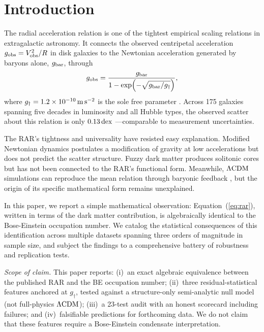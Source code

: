 \documentclass[twocolumn,twocolappendix]{aastex631}
\newcommand{\gbar}{g_{\rm bar}}
\newcommand{\gobs}{g_{\rm obs}}
\newcommand{\gdag}{g_{\dagger}}
\newcommand{\dex}{\,{\rm dex}}
\newcommand{\lcdm}{\Lambda{\rm CDM}}
\begin{document}
\section{Introduction} \label{sec:intro}

The radial acceleration relation \citep[RAR;][]{McGaugh2016} is one of the
tightest empirical scaling relations in extragalactic astronomy. It connects
the observed centripetal acceleration $\gobs = V_{\rm obs}^2/R$ in disk
galaxies to the Newtonian acceleration generated by baryons alone, $\gbar$,
through
\begin{equation}\label{eq:rar}
    \gobs = \frac{\gbar}{1 - \exp\!\left(-\sqrt{\gbar/\gdag}\right)},
\end{equation}
where $\gdag = 1.2 \times 10^{-10}\,{\rm m\,s^{-2}}$ is the sole free
parameter \citep{Lelli2017}. Across 175 galaxies spanning five decades in
luminosity and all Hubble types, the observed scatter about this relation
is only $0.13\dex$ \citep{Li2018}---comparable to measurement uncertainties.

The RAR's tightness and universality have resisted easy explanation. Modified
Newtonian dynamics \citep[MOND;][]{Milgrom1983} postulates a modification
of gravity at low accelerations but does not predict the scatter structure.
Fuzzy dark matter \citep[FDM;][]{Schive2014,Ferreira2021} produces solitonic
cores but has not been connected to the RAR's functional form. Meanwhile,
$\lcdm$ simulations can reproduce the mean relation through baryonic feedback
\citep{Keller2017,Ludlow2017}, but the origin of its specific mathematical
form remains unexplained.

In this paper, we report a simple mathematical observation:
Equation~(\ref{eq:rar}), written in terms of the dark matter contribution,
is algebraically identical to the Bose-Einstein occupation number. We catalog
the statistical consequences of this identification across multiple datasets
spanning three orders of magnitude in sample size, and subject the findings
to a comprehensive battery of robustness and replication tests.

\medskip
\noindent\textit{Scope of claim.} This paper reports:
(i)~an exact algebraic equivalence between the published RAR and the BE
occupation number;
(ii)~three residual-statistical features anchored at $\gdag$, tested against
a structure-only semi-analytic null model (not full-physics $\lcdm$);
(iii)~a 23-test audit with an honest scorecard including failures; and
(iv)~falsifiable predictions for forthcoming data. We do not claim that
these features require a Bose-Einstein condensate interpretation.
\end{document}
